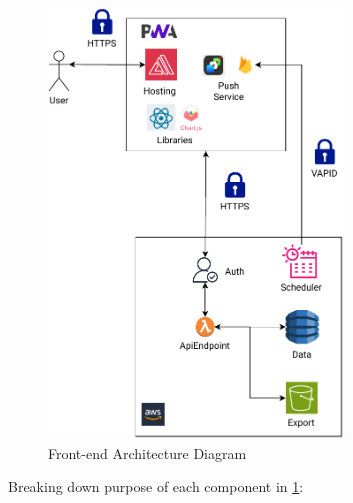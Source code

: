 \begin{figure}
    
    \centering
    \includegraphics[width=0.7\textwidth,keepaspectratio]{../images/frontend.pdf}
    \caption{Front-end Architecture Diagram}
    \label{fig:frontend}
    
\end{figure}
Breaking down purpose of each component in \ref{fig:frontend}:
